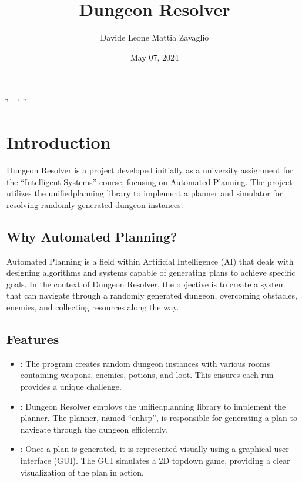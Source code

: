 \documentclass[letterpaper,10pt,english]{sphinxmanual}
\title{Dungeon Resolver}
\date{May 07, 2024}
\author{Davide Leone \sphinxhyphen{} Mattia Zavaglio}
\begin{document}
\ifdefined\shorthandoff
  \ifnum\catcode`\=\string=\active\shorthandoff{=}\fi
  \ifnum\catcode`\"=\active{}\fi
\fi

\pagestyle{empty}
\sphinxmaketitle
\pagestyle{plain}
\sphinxtableofcontents
\pagestyle{normal}
\label{\detokenize{index::doc}}



\chapter{Introduction}
\label{\detokenize{index:introduction}}
\sphinxAtStartPar
Dungeon Resolver is a project developed initially as a university assignment for the “Intelligent Systems” course, focusing on Automated Planning. The project utilizes the unified\sphinxhyphen{}planning library to implement a planner and simulator for resolving randomly generated dungeon instances.


\section{Why Automated Planning?}
\label{\detokenize{index:why-automated-planning}}
\sphinxAtStartPar
Automated Planning is a field within Artificial Intelligence (AI) that deals with designing algorithms and systems capable of generating plans to achieve specific goals. In the context of Dungeon Resolver, the objective is to create a system that can navigate through a randomly generated dungeon, overcoming obstacles, enemies, and collecting resources along the way.


\section{Features}
\label{\detokenize{index:features}}\begin{itemize}
\item {} 
\sphinxAtStartPar
{}: The program creates random dungeon instances with various rooms containing weapons, enemies, potions, and loot. This ensures each run provides a unique challenge.

\item {} 
\sphinxAtStartPar
{}: Dungeon Resolver employs the unified\sphinxhyphen{}planning library to implement the planner. The planner, named “enhsp”, is responsible for generating a plan to navigate through the dungeon efficiently.

\item {} 
\sphinxAtStartPar
{}: Once a plan is generated, it is represented visually using a graphical user interface (GUI). The GUI simulates a 2D top\sphinxhyphen{}down game, providing a clear visualization of the plan in action.

\end{itemize}
\end{document}
